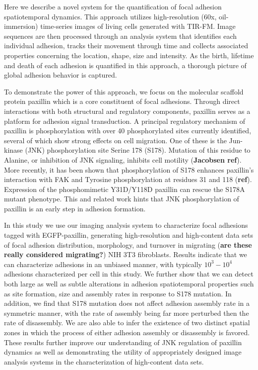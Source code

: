\documentclass[10pt]{article}
\begin{document}
Here we describe a novel system for the quantification of focal adhesion
spatiotemporal dynamics. This approach utilizes high-resolution (60x,
oil-immersion) time-series images of living cells generated with TIR-FM. Image
sequences are then processed through an analysis system that identifies each
individual adhesion, tracks their movement through time and collects associated
properties concerning the location, shape, size and intensity. As the birth,
lifetime and death of each adhesion is quantified in this approach, a thorough
picture of global adhesion behavior is captured.

To demonstrate the power of this approach, we focus on the molecular scaffold
protein paxillin which is a core constituent of focal adhesions. Through direct
interactions with both structural and regulatory components, paxillin serves as
a platform for adhesion signal transduction. A principal regulatory mechanism of
paxillin is phosphorylation with over 40 phosphorylated sites currently
identified, several of which show strong effects on cell migration. One of these
is the Jun-kinase (JNK) phosphorylation site Serine 178 (S178). Mutation of this
residue to Alanine, or inhibition of JNK signaling, inhibits cell motility
(\textbf{Jacobsen ref}).  More recently, it has been shown that phosphorylation of S178
enhances paxillin's interaction with FAK and Tyrosine phosphorylation at
residues 31 and 118 (\textbf{ref}). Expression of the phosphomimetic Y31D/Y118D paxillin
can rescue the S178A mutant phenotype. This and related work hints that JNK
phosphorylation of paxillin is an early step in adhesion formation. 

In this study we use our imaging analysis system to characterize focal adhesions
tagged with EGFP-paxillin, generating high-resolution and high-content data sets
of focal adhesion distribution, morphology, and turnover in migrating
(\textbf{are these really considered migrating?}) NIH 3T3 fibroblasts. Results
indicate that we can characterize adhesions in an unbiased manner, with
typically $10^3-10^4$ adhesions characterized per cell in this study. We further
show that we can detect both large as well as subtle alterations in adhesion
spatiotemporal properties such as site formation, size and assembly rates in
response to S178 mutation. In addition, we find that S178 mutation does not
affect adhesion assembly rate in a symmetric manner, with the rate of
assembly being far more perturbed then the rate of disassembly. We are also able to infer the existence of two distinct spatial zones in which the process of either adhesion assembly or disassembly is favored. These results
further improve our understanding of JNK regulation of paxillin dynamics as well
as demonstrating the utility of appropriately designed image analysis systems in
the characterization of high-content data sets. 
\end{document}
